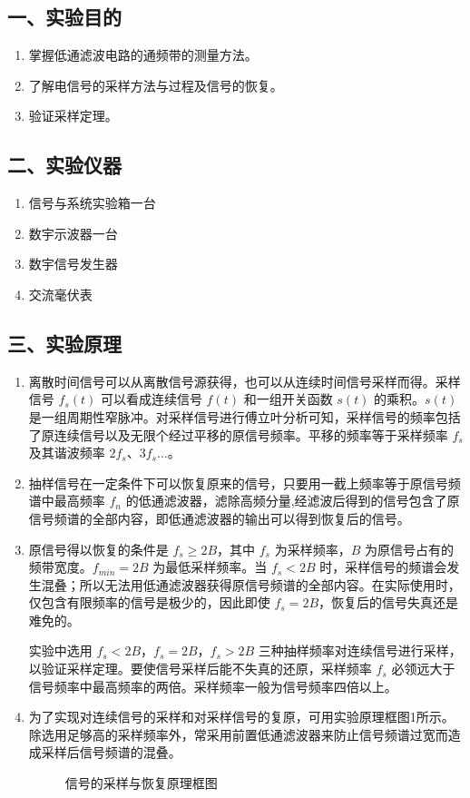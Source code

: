 \documentclass[dvipsnames, svgnames,a4paper,11pt]{article}
\begin{document}
\subsection*{一、实验目的}
\begin{enumerate}
  \item 掌握低通滤波电路的通频带的测量方法。
  \item 了解电信号的采样方法与过程及信号的恢复。
  \item 验证采样定理。
\end{enumerate}

\subsection*{二、实验仪器}
\begin{enumerate}
  \item 信号与系统实验箱一台
  \item 数宇示波器一台
  \item 数宇信号发生器
  \item 交流毫伏表
\end{enumerate}

\subsection*{三、实验原理}

\begin{enumerate}
  \item 离散时间信号可以从离散信号源获得，也可以从连续时间信号采样而得。采样信号 $f_s(t)$ 可以看成连续信号 $f(t)$ 和一组开关函数 $s(t)$ 的乘积。$s(t)$ 是一组周期性窄脉冲。对采样信号进行傅立叶分析可知，采样信号的频率包括了原连续信号以及无限个经过平移的原信号频率。平移的频率等于采样频率 $f_s$ 及其谐波频率 $2f_s$、$3f_s$...。
  \item 抽样信号在一定条件下可以恢复原来的信号，只要用一截上频率等于原信号频谱中最高频率 $f_n$ 的低通滤波器，滤除高频分量,经滤波后得到的信号包含了原信号频谱的全部内容，即低通滤波器的输出可以得到恢复后的信号。
  \item 原信号得以恢复的条件是 $f_s \ge 2B$，其中 $f_s$ 为采样频率，$B$ 为原信号占有的频带宽度。$f_{min}=2B$ 为最低采样频率。当 $f_s < 2B$ 时，采样信号的频谱会发生混叠；所以无法用低通滤波器获得原信号频谱的全部内容。在实际使用时，仅包含有限频率的信号是极少的，因此即使 $f_s=2B$，恢复后的信号失真还是难免的。
  
  实验中选用 $f_s<2B$，$f_s=2B$，$f_s>2B$ 三种抽样频率对连续信号进行采样，以验证采样定理。要使信号采样后能不失真的还原，采样频率 $f_s$ 必领远大于信号频率中最高频率的两倍。采样频率一般为信号频率四倍以上。
  \item 为了实现对连续信号的采样和对采样信号的复原，可用实验原理框图1所示。除选用足够高的采样频率外，常采用前置低通滤波器来防止信号频谱过宽而造成采样后信号频谱的混叠。
  \begin{figure}[htbp]
    \centering
    \caption{信号的采样与恢复原理框图}
  \end{figure}
\end{enumerate}
\end{document}
